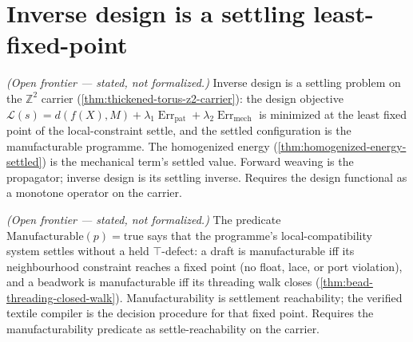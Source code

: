 \section{Inverse design is a settling least-fixed-point}

\begin{theorem}\label{thm:inverse-design-least-fixed-point}\notready{}
\emph{(Open frontier --- stated, not formalized.)} Inverse design is a settling
problem on the $\mathbb{Z}^2$ carrier
(\cref{thm:thickened-torus-z2-carrier}): the design objective
$\mathcal{L}(s)=d(f(X),M)+\lambda_1\operatorname{Err}_{\text{pat}}+\lambda_2\operatorname{Err}_{\text{mech}}$
is minimized at the least fixed point of the local-constraint settle, and the settled
configuration is the manufacturable programme. The homogenized energy
(\cref{thm:homogenized-energy-settled}) is the mechanical term's settled value. Forward
weaving is the propagator; inverse design is its settling inverse. Requires the design
functional as a monotone operator on the carrier.
\end{theorem}

\begin{theorem}\label{thm:manufacturability-settling-predicate}\notready{}
\emph{(Open frontier --- stated, not formalized.)} The predicate
$\mathrm{Manufacturable}(p)=\mathrm{true}$ says that the programme's
local-compatibility system settles without a held
$\top$-defect: a draft is manufacturable iff its neighbourhood constraint reaches a fixed
point (no float, lace, or port violation), and a beadwork is manufacturable iff its threading
walk closes (\cref{thm:bead-threading-closed-walk}). Manufacturability is settlement
reachability; the verified textile compiler is the decision procedure for that fixed point.
Requires the manufacturability predicate as settle-reachability on the carrier.
\end{theorem}
